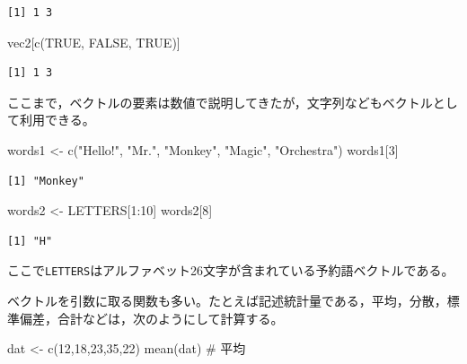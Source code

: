 \documentclass[
  a4paper,
]{ltjsbook}
\newenvironment{Shaded}{\begin{snugshade}}{\end{snugshade}}
\newcommand{\CommentTok}[1]{\textcolor[rgb]{0.37,0.37,0.37}{#1}}
\newcommand{\ConstantTok}[1]{\textcolor[rgb]{0.56,0.35,0.01}{#1}}
\newcommand{\DecValTok}[1]{\textcolor[rgb]{0.68,0.00,0.00}{#1}}
\newcommand{\FunctionTok}[1]{\textcolor[rgb]{0.28,0.35,0.67}{#1}}
\newcommand{\NormalTok}[1]{\textcolor[rgb]{0.00,0.23,0.31}{#1}}
\newcommand{\OtherTok}[1]{\textcolor[rgb]{0.00,0.23,0.31}{#1}}
\newcommand{\SpecialCharTok}[1]{\textcolor[rgb]{0.37,0.37,0.37}{#1}}
\newcommand{\StringTok}[1]{\textcolor[rgb]{0.13,0.47,0.30}{#1}}
\begin{document}
\begin{verbatim}
[1] 1 3
\end{verbatim}

\begin{Shaded}
\begin{Highlighting}[]
\NormalTok{vec2[}\FunctionTok{c}\NormalTok{(}\ConstantTok{TRUE}\NormalTok{, }\ConstantTok{FALSE}\NormalTok{, }\ConstantTok{TRUE}\NormalTok{)]}
\end{Highlighting}
\end{Shaded}

\begin{verbatim}
[1] 1 3
\end{verbatim}

ここまで，ベクトルの要素は数値で説明してきたが，文字列などもベクトルとして利用できる。

\begin{Shaded}
\begin{Highlighting}[]
\NormalTok{words1 }\OtherTok{\textless{}{-}} \FunctionTok{c}\NormalTok{(}\StringTok{"Hello!"}\NormalTok{, }\StringTok{"Mr."}\NormalTok{, }\StringTok{"Monkey"}\NormalTok{, }\StringTok{"Magic"}\NormalTok{, }\StringTok{"Orchestra"}\NormalTok{)}
\NormalTok{words1[}\DecValTok{3}\NormalTok{]}
\end{Highlighting}
\end{Shaded}

\begin{verbatim}
[1] "Monkey"
\end{verbatim}

\begin{Shaded}
\begin{Highlighting}[]
\NormalTok{words2 }\OtherTok{\textless{}{-}}\NormalTok{ LETTERS[}\DecValTok{1}\SpecialCharTok{:}\DecValTok{10}\NormalTok{]}
\NormalTok{words2[}\DecValTok{8}\NormalTok{]}
\end{Highlighting}
\end{Shaded}

\begin{verbatim}
[1] "H"
\end{verbatim}

ここで\texttt{LETTERS}はアルファベット26文字が含まれている予約語ベクトルである。

ベクトルを引数に取る関数も多い。たとえば記述統計量である，平均，分散，標準偏差，合計などは，次のようにして計算する。

\begin{Shaded}
\begin{Highlighting}[]
\NormalTok{dat }\OtherTok{\textless{}{-}} \FunctionTok{c}\NormalTok{(}\DecValTok{12}\NormalTok{,}\DecValTok{18}\NormalTok{,}\DecValTok{23}\NormalTok{,}\DecValTok{35}\NormalTok{,}\DecValTok{22}\NormalTok{)}
\FunctionTok{mean}\NormalTok{(dat) }\CommentTok{\# 平均}
\end{Highlighting}
\end{Shaded}
\end{document}
